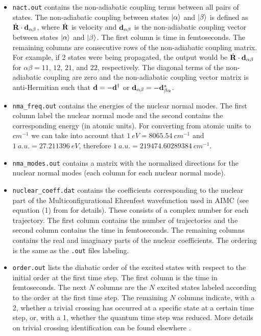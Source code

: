 \begin{itemize}
\item \verb+nact.out+ contains the non-adiabatic coupling terms between all pairs of states.  The non-adiabatic coupling between states $\ket{\alpha}$ and $\ket{\beta}$ is defined as $\dot{{\bf{R}}}\cdot{\bf{d}}_{\alpha\beta}$, where $\dot{{\bf{R}}}$ is velocity and ${\bf{d}}_{\alpha\beta}$ is the non-adiabatic coupling vector between states $\ket{\alpha}$ and ${\ket{\beta}}$.  The first column is time in femtoseconds.  The remaining columns are consecutive rows of the non-adiabatic coupling matrix.  For example, if 2 states were being propagated, the output would be $\dot{{\bf{R}}}\cdot{\bf{d}}_{\alpha\beta}$ for $\alpha\beta=11$, $12$, $21$, and $22$, respectively.  The diagonal terms of the non-adiabatic coupling are zero and the non-adiabatic coupling vector matrix is anti-Hermitian such that ${\bf{d}}=-{\bf{d}}^{\dagger}$ or ${\bf{d}}_{\alpha\beta}=-{\bf{d}}_{\beta\alpha}^{*}$.
\item \verb+nma_freq.out+ contains the energies of the nuclear normal modes. The first column label the nuclear normal mode and the second contains the corresponding energy (in atomic units). For converting from atomic units to $cm^{-1}$ we can take into account that $1~eV=8065.54~cm^{-1}$ and $1~a.u. = 27.211396~eV$, therefore $1~a.u. = 219474.60289384~cm^{-1}$.
\item \verb+nma_modes.out+ contains a matrix with the normalized directions for the nuclear normal modes (each column for each nuclear normal mode).
\item \verb+nuclear_coeff.dat+ contains the coefficients corresponding to the nuclear part of the Multiconfigurational Ehrenfest wavefunction used in AIMC (see equation (1) from \cite{freixas2018ab} for details). These consists of a complex number for each trajectory. The first column contains the number of trajectories and the second column contains the time in femtoseconds. The remaining columns contains the real and imaginary parts of the nuclear coefficients. The ordering is the same as the \verb+.out+ files labeling.
\item \verb+order.out+ lists the diabatic order of the excited states with respect to the initial order at the first time step.  The first column is the time in femtoseconds.  The next $N$ columns are the $N$ excited states labeled according to the order at the first time step.  The remaining $N$ columns indicate, with a 2, whether a trivial crossing has occurred at a specific state at a certain time step, or, with a 1, whether the quantum time step was reduced. More details on trivial crossing identification can be found elsewhere \cite{nelson2013artifacts}.

\end{itemize}
